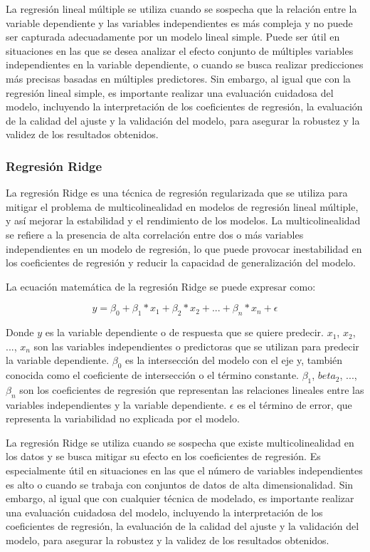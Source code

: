 La regresión lineal múltiple se utiliza cuando se sospecha que la relación entre la variable dependiente y las variables independientes es más compleja y no puede ser capturada adecuadamente por un modelo lineal simple. Puede ser útil en situaciones en las que se desea analizar el efecto conjunto de múltiples variables independientes en la variable dependiente, o cuando se busca realizar predicciones más precisas basadas en múltiples predictores. Sin embargo, al igual que con la regresión lineal simple, es importante realizar una evaluación cuidadosa del modelo, incluyendo la interpretación de los coeficientes de regresión, la evaluación de la calidad del ajuste y la validación del modelo, para asegurar la robustez y la validez de los resultados obtenidos.


\subsubsection{Regresión Ridge}
La regresión Ridge es una técnica de regresión regularizada que se utiliza para mitigar el problema de multicolinealidad en modelos de regresión lineal múltiple, y así mejorar la estabilidad y el rendimiento de los modelos. La multicolinealidad se refiere a la presencia de alta correlación entre dos o más variables independientes en un modelo de regresión, lo que puede provocar inestabilidad en los coeficientes de regresión y reducir la capacidad de generalización del modelo.

La ecuación matemática de la regresión Ridge se puede expresar como:

$$y = \beta_0 + \beta_1 * x_1 + \beta_2 * x_2 + ... + \beta_n * x_n + \epsilon$$

Donde $y$ es la variable dependiente o de respuesta que se quiere predecir. $x_1$, $x_2$, ..., $x_n$ son las variables independientes o predictoras que se utilizan para predecir la variable dependiente. $\beta_0$ es la intersección del modelo con el eje y, también conocida como el coeficiente de intersección o el término constante. $\beta_1$, $beta_2$, ..., $\beta_n$ son los coeficientes de regresión que representan las relaciones lineales entre las variables independientes y la variable dependiente. $\epsilon$ es el término de error, que representa la variabilidad no explicada por el modelo.

La regresión Ridge se utiliza cuando se sospecha que existe multicolinealidad en los datos y se busca mitigar su efecto en los coeficientes de regresión. Es especialmente útil en situaciones en las que el número de variables independientes es alto o cuando se trabaja con conjuntos de datos de alta dimensionalidad. Sin embargo, al igual que con cualquier técnica de modelado, es importante realizar una evaluación cuidadosa del modelo, incluyendo la interpretación de los coeficientes de regresión, la evaluación de la calidad del ajuste y la validación del modelo, para asegurar la robustez y la validez de los resultados obtenidos.


